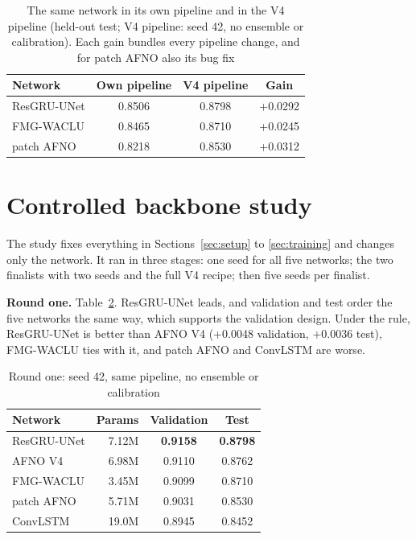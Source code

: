 \documentclass[conference]{IEEEtran}
\begin{document}
\begin{table}[!t]
\centering
\caption{The same network in its own pipeline and in the V4 pipeline (held-out test; V4 pipeline: seed 42, no ensemble or calibration). Each gain bundles every pipeline change, and for patch AFNO also its bug fix}
\label{tab:samepipe}
\begin{tabular}{@{}lccc@{}}
\toprule
Network & Own pipeline & V4 pipeline & Gain \\
\midrule
ResGRU-UNet & 0.8506 & 0.8798 & +0.0292 \\
FMG-WACLU & 0.8465 & 0.8710 & +0.0245 \\
patch AFNO & 0.8218 & 0.8530 & +0.0312 \\
\bottomrule
\end{tabular}
\end{table}

\section{Controlled backbone study}
\label{sec:study}
The study fixes everything in Sections~\ref{sec:setup} to \ref{sec:training} and changes only the network. It ran in three stages: one seed for all five networks; the two finalists with two seeds and the full V4 recipe; then five seeds per finalist.

\textbf{Round one.} Table~\ref{tab:round1}. ResGRU-UNet leads, and validation and test order the five networks the same way, which supports the validation design. Under the rule, ResGRU-UNet is better than AFNO V4 (+0.0048 validation, +0.0036 test), FMG-WACLU ties with it, and patch AFNO and ConvLSTM are worse.

\begin{table}[!t]
\centering
\caption{Round one: seed 42, same pipeline, no ensemble or calibration}
\label{tab:round1}
\begin{tabular}{@{}lrcc@{}}
\toprule
Network & Params & Validation & Test \\
\midrule
ResGRU-UNet & 7.12M & \textbf{0.9158} & \textbf{0.8798} \\
AFNO V4 & 6.98M & 0.9110 & 0.8762 \\
FMG-WACLU & 3.45M & 0.9099 & 0.8710 \\
patch AFNO & 5.71M & 0.9031 & 0.8530 \\
ConvLSTM & 19.0M & 0.8945 & 0.8452 \\
\bottomrule
\end{tabular}
\end{table}
\end{document}
